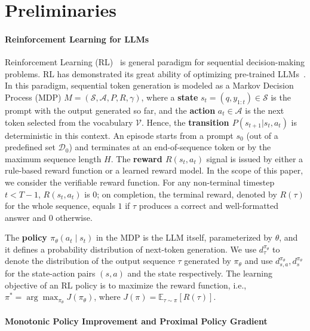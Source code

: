 \section{Preliminaries}
\label{sec:preliminaries}

\paragraph{Reinforcement Learning for LLMs}

Reinforcement Learning (RL)~\citep{Sutton1988ReinforcementLA} is general paradigm for sequential decision-making problems. RL has demonstrated its great ability of optimizing pre-trained LLMs~\citep{trung2024reft,jaech2024openai}.
In this paradigm, sequential token generation is modeled as a Markov Decision Process (MDP) $M = (\mathcal{S}, \mathcal{A}, P, R, \gamma)$,
where a \textbf{state} $s_t = (q, y_{1:t}) \in \mathcal{S}$ is the prompt with the output generated so far, and the \textbf{action} $a_t \in \mathcal{A}$ is the next token selected from the vocabulary $\mathcal{V}$. 
Hence, the \textbf{transition $P(s_{t+1}|s_t, a_t)$} is deterministic in this context.
An episode starts from a prompt $s_0$ (out of a predefined set $\mathcal{D}_0$) and terminates at an end-of-sequence token or by the maximum sequence length $H$.
The \textbf{reward $R(s_t, a_t)$} signal is issued by either a rule-based reward function or a learned reward model.
In the scope of this paper, we consider the verifiable reward function. For any non-terminal timestep $t < T-1$, $R(s_t, a_t)$ is $0$; on completion, the terminal reward, denoted by $R(\tau)$ for the whole sequence, equals $1$ if $\tau$ produces a correct and well-formatted answer and $0$ otherwise.

The \textbf{policy $\pi_\theta(a_t \mid s_t)$} in the MDP is the LLM itself, parameterized by $\theta$, and it defines a probability distribution of next-token generation. 
We use $d^{\pi_{\theta}}_{\tau}$ to denote the distribution of the output sequence $\tau$ generated by $\pi_{\theta}$ and use $d^{\pi_{\theta}}_{s,a}, d^{\pi_{\theta}}_{s}$ for the state-action pairs $(s,a)$ and the state respectively. 
The learning objective of an RL policy is to maximize the reward function, i.e., $\pi^* = \arg \max_{\pi_{\theta}} J(\pi_{\theta})$, where $J(\pi)
    =
    \mathbb{E}_{\tau \sim \pi}
    \left[
        R(\tau)
    \right]$. 


\vspace{-0.2cm}

\paragraph{Monotonic Policy Improvement and Proximal Policy Gradient}

